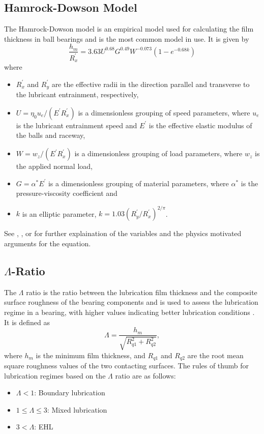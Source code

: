\subsection{Hamrock-Dowson Model}
The Hamrock-Dowson model is an empirical model used for calculating the film thickness in ball bearings and is the most common model in use. It is given by
\begin{equation}
    \frac{h_m}{R_{x}^{'}} = 3.63U^{0.68}G^{0.49}W^{-0.073}(1-e^{-0.68k})
\end{equation}
where
\begin{itemize}
    \item $R^{'}_{x}$ and $R^{'}_{y}$ are the effective radii in the direction parallel and transverse to the lubricant entrainment, respectively,
    \item $U=\eta_0u_e/(E^{'}R^{'}_{x})$ is a dimensionless grouping of speed parameters, where $u_e$ is the lubricant entrainment speed and $E^{'}$ is the effective elastic modulus of the balls and raceway,
    \item $W=w_z/(E^{'}R^{'}_{x})$ is a dimensionless grouping of load parameters, where $w_z$ is the applied normal load,
    \item $G=\alpha^*E^{'}$ is a dimensionless grouping of material parameters, where $\alpha^*$ is the pressure-viscosity coefficient and
    \item $k$ is an elliptic parameter, $k=1.03(R_{y}^{'}/R_{x}^{'})^{2/\pi}$.
\end{itemize}

See \cite{cen_ehl_2021}, \cite{hansen_new_2021}, \cite{maruyama_lubrication_2019} or \cite{noauthor_elasto-hydrodynamic_1977} for further explaination of the variables and the physics motivated arguments for the equation.

\subsection{$\Lambda$-Ratio}
The $\Lambda$ ratio is the ratio between the lubrication film thickness and the composite surface roughness of the bearing components and is used to assess the lubrication regime in a bearing, with higher values indicating better lubrication conditions \cite{jakobsen_detecting_2023} \cite{hou_-situ_2025}. It is defined as
\begin{equation}
\Lambda = \frac{h_{m}}{\sqrt{R_{q1}^2 + R_{q2}^2}},
\end{equation}
where $h_{m}$ is the minimum film thickness, and $R_{q1}$ and $R_{q2}$ are the root mean square roughness values of the two contacting surfaces. The rules of thumb for lubrication regimes based on the $\Lambda$ ratio are as follows:
\begin{itemize}
    \item $\Lambda < 1$: Boundary lubrication
    \item $1 \leq \Lambda \leq 3$: Mixed lubrication
    \item $3 < \Lambda$: EHL
\end{itemize}

